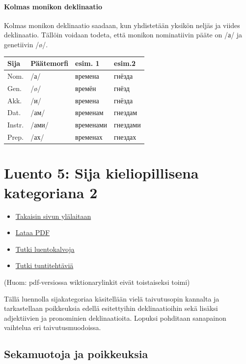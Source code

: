 \documentclass[]{scrartcl}
\providecommand{\tightlist}{%
  \setlength{\itemsep}{0pt}\setlength{\parskip}{0pt}}
\begin{document}
\paragraph{Kolmas monikon deklinaatio}\label{kolmas-monikon-deklinaatio}

Kolmas monikon deklinaatio saadaan, kun yhdistetään yksikön neljäs ja
viides deklinaatio. Tällöin voidaan todeta, että monikon nominatiivin
pääte on /а/ ja genetiivin /ø/.

\begin{longtable}[c]{@{}llll@{}}
\toprule
Sija & Päätemorfi & esim. 1 & esim.2\tabularnewline
\midrule
\endhead
Nom. & /а/ & времена & гнёзда\tabularnewline
Gen. & /ø/ & времён & гнёзд\tabularnewline
Akk. & /и/ & времена & гнёзда\tabularnewline
Dat. & /ам/ & временам & гнездам\tabularnewline
Instr. & /ами/ & временами & гнездами\tabularnewline
Prep. & /ах/ & временах & гнездах\tabularnewline
\bottomrule
\end{longtable}

\section{Luento 5: Sija kieliopillisena kategoriana
2}\label{luento-5-sija-kieliopillisena-kategoriana-2}

\begin{itemize}
\tightlist
\item
  \href{https://mustikka.uta.fi/~juho_harme/morfologia/\#tästä-kurssista}{Takaisin
  sivun ylälaitaan}
\item
  \href{http://mustikka.uta.fi/~juho_harme/morfologia/materiaalit/luento5.pdf}{Lataa
  PDF}
\item
  \href{http://mustikka.uta.fi/~juho_harme/morfologia/presentations/luento5.html}{Tutki
  luentokalvoja}
\item
  \href{http://mustikka.uta.fi/~juho_harme/morfologia/tehtavat/luento5.pdf}{Tutki
  tuntitehtäviä}
\end{itemize}

(Huom: pdf-versiossa wiktionarylinkit eivät toistaiseksi toimi)

Tällä luennolla sijakategoriaa käsitellään vielä taivutusopin kannalta
ja tarkastellaan poikkeuksia edellä esitettyihin deklinaatioihin sekä
lisäksi adjektiivien ja pronominien deklinaatioita. Lopuksi pohditaan
sanapainon vaihtelua eri taivutusmuodoissa.

\subsection{Sekamuotoja ja
poikkeuksia}\label{sekamuotoja-ja-poikkeuksia}
\end{document}
